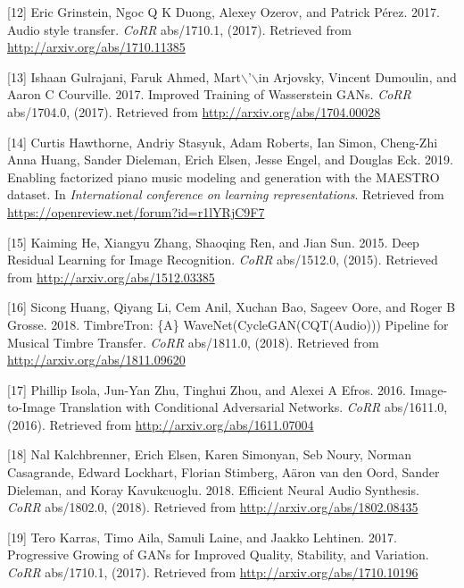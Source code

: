 \documentclass[12pt,a4paper,]{report}
\begin{document}
\leavevmode\hypertarget{ref-DBLP:journalsux2fcorrux2fabs-1710-11385}{}%
{[}12{]} Eric Grinstein, Ngoc Q K Duong, Alexey Ozerov, and Patrick
Pérez. 2017. Audio style transfer. \emph{CoRR} abs/1710.1, (2017).
Retrieved from \url{http://arxiv.org/abs/1710.11385}

\leavevmode\hypertarget{ref-DBLP:journalsux2fcorrux2fGulrajaniAADC17}{}%
{[}13{]} Ishaan Gulrajani, Faruk Ahmed,
Mart\(\backslash\)'\(\backslash\)in Arjovsky, Vincent Dumoulin, and
Aaron C Courville. 2017. Improved Training of Wasserstein GANs.
\emph{CoRR} abs/1704.0, (2017). Retrieved from
\url{http://arxiv.org/abs/1704.00028}

\leavevmode\hypertarget{ref-hawthorne2018enabling}{}%
{[}14{]} Curtis Hawthorne, Andriy Stasyuk, Adam Roberts, Ian Simon,
Cheng-Zhi Anna Huang, Sander Dieleman, Erich Elsen, Jesse Engel, and
Douglas Eck. 2019. Enabling factorized piano music modeling and
generation with the MAESTRO dataset. In \emph{International conference
on learning representations}. Retrieved from
\url{https://openreview.net/forum?id=r1lYRjC9F7}

\leavevmode\hypertarget{ref-DBLP:journalsux2fcorrux2fHeZRS15}{}%
{[}15{]} Kaiming He, Xiangyu Zhang, Shaoqing Ren, and Jian Sun. 2015.
Deep Residual Learning for Image Recognition. \emph{CoRR} abs/1512.0,
(2015). Retrieved from \url{http://arxiv.org/abs/1512.03385}

\leavevmode\hypertarget{ref-DBLP:journalsux2fcorrux2fabs-1811-09620}{}%
{[}16{]} Sicong Huang, Qiyang Li, Cem Anil, Xuchan Bao, Sageev Oore, and
Roger B Grosse. 2018. TimbreTron: \{A\} WaveNet(CycleGAN(CQT(Audio)))
Pipeline for Musical Timbre Transfer. \emph{CoRR} abs/1811.0, (2018).
Retrieved from \url{http://arxiv.org/abs/1811.09620}

\leavevmode\hypertarget{ref-DBLP:journalsux2fcorrux2fIsolaZZE16}{}%
{[}17{]} Phillip Isola, Jun-Yan Zhu, Tinghui Zhou, and Alexei A Efros.
2016. Image-to-Image Translation with Conditional Adversarial Networks.
\emph{CoRR} abs/1611.0, (2016). Retrieved from
\url{http://arxiv.org/abs/1611.07004}

\leavevmode\hypertarget{ref-DBLP:journalsux2fcorrux2fabs-1802-08435}{}%
{[}18{]} Nal Kalchbrenner, Erich Elsen, Karen Simonyan, Seb Noury,
Norman Casagrande, Edward Lockhart, Florian Stimberg, Aäron van den
Oord, Sander Dieleman, and Koray Kavukcuoglu. 2018. Efficient Neural
Audio Synthesis. \emph{CoRR} abs/1802.0, (2018). Retrieved from
\url{http://arxiv.org/abs/1802.08435}

\leavevmode\hypertarget{ref-DBLP:journalsux2fcorrux2fabs-1710-10196}{}%
{[}19{]} Tero Karras, Timo Aila, Samuli Laine, and Jaakko Lehtinen.
2017. Progressive Growing of GANs for Improved Quality, Stability, and
Variation. \emph{CoRR} abs/1710.1, (2017). Retrieved from
\url{http://arxiv.org/abs/1710.10196}
\end{document}
